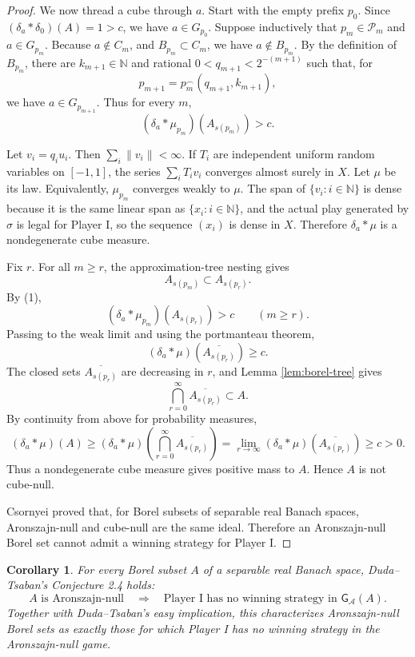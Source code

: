 \documentclass[11pt]{amsart}
\newtheorem{corollary}[theorem]{Corollary}
\newcommand{\N}{\mathbb N}
\newcommand{\Acal}{\mathcal A}
\newcommand{\Pcal}{\mathcal P}
\begin{document}
\begin{proof}
We now thread a cube through \(a\).  Start with the empty prefix \(p_0\).  Since
\((\delta_a*\delta_0)(A)=1>c\), we have \(a\in G_{p_0}\).  Suppose inductively
that \(p_m\in\Pcal_m\) and \(a\in G_{p_m}\).  Because \(a\notin C_m\), and
\(B_{p_m}\subset C_m\), we have \(a\notin B_{p_m}\).  By the definition of
\(B_{p_m}\), there are \(k_{m+1}\in\N\) and rational
\(0<q_{m+1}<2^{-(m+1)}\) such that, for
\[
  p_{m+1}=p_m^\frown(q_{m+1},k_{m+1}),
\]
we have \(a\in G_{p_{m+1}}\).  Thus for every \(m\),
\[
  (\delta_a*\mu_{p_m})(A_{s(p_m)})>c. \tag{1}
\]

Let \(v_i=q_i u_i\).  Then \(\sum_i\|v_i\|<\infty\).  If \(T_i\) are
independent uniform random variables on \([-1,1]\), the series
\(\sum_i T_i v_i\) converges almost surely in \(X\).  Let \(\mu\) be its law.
Equivalently, \(\mu_{p_m}\) converges weakly to \(\mu\).  The span of
\(\{v_i:i\in\N\}\) is dense because it is the same linear span as
\(\{x_i:i\in\N\}\), and the actual play generated by \(\sigma\) is legal for
Player I, so the sequence \((x_i)\) is dense in \(X\).
Therefore \(\delta_a*\mu\) is a nondegenerate cube measure.

Fix \(r\).  For all \(m\ge r\), the approximation-tree nesting gives
\[
  A_{s(p_m)}\subset A_{s(p_r)}.
\]
By (1),
\[
  (\delta_a*\mu_{p_m})(A_{s(p_r)})>c\qquad (m\ge r).
\]
Passing to the weak limit and using the portmanteau theorem,
\[
  (\delta_a*\mu)(\overline{A_{s(p_r)}})\ge c.
\]
The closed sets \(\overline{A_{s(p_r)}}\) are decreasing in \(r\), and Lemma
\ref{lem:borel-tree} gives
\[
  \bigcap_{r=0}^{\infty}\overline{A_{s(p_r)}}\subset A.
\]
By continuity from above for probability measures,
\[
  (\delta_a*\mu)(A)
  \ge
  (\delta_a*\mu)\left(\bigcap_{r=0}^{\infty}\overline{A_{s(p_r)}}\right)
  =
  \lim_{r\to\infty}(\delta_a*\mu)(\overline{A_{s(p_r)}})
  \ge c>0.
\]
Thus a nondegenerate cube measure gives positive mass to \(A\).  Hence \(A\)
is not cube-null.

Csornyei proved that, for Borel subsets of separable real Banach spaces,
Aronszajn-null and cube-null are the same ideal.  Therefore an Aronszajn-null
Borel set cannot admit a winning strategy for Player I.
\end{proof}

\begin{corollary}
For every Borel subset \(A\) of a separable real Banach space, Duda--Tsaban's
Conjecture 2.4 holds:
\[
  A\text{ is Aronszajn-null}
  \quad\Longrightarrow\quad
  \text{Player I has no winning strategy in }\mathsf G_{\Acal}(A).
\]
Together with Duda--Tsaban's easy implication, this characterizes
Aronszajn-null Borel sets as exactly those for which Player I has no winning
strategy in the Aronszajn-null game.
\end{corollary}
\end{document}
